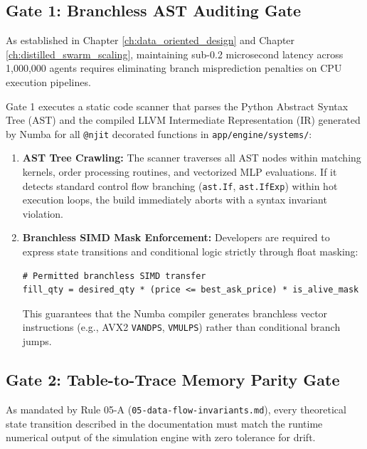 \subsection{Gate 1: Branchless AST Auditing Gate}

As established in Chapter \ref{ch:data_oriented_design} and Chapter \ref{ch:distilled_swarm_scaling}, maintaining sub-0.2 microsecond latency across 1,000,000 agents requires eliminating branch misprediction penalties on CPU execution pipelines. 

Gate 1 executes a static code scanner that parses the Python Abstract Syntax Tree (AST) and the compiled LLVM Intermediate Representation (IR) generated by Numba for all \texttt{@njit} decorated functions in \texttt{app/engine/systems/}:

\begin{enumerate}
    \item \textbf{AST Tree Crawling:} The scanner traverses all AST nodes within matching kernels, order processing routines, and vectorized MLP evaluations. If it detects standard control flow branching (\texttt{ast.If}, \texttt{ast.IfExp}) within hot execution loops, the build immediately aborts with a syntax invariant violation.
    \item \textbf{Branchless SIMD Mask Enforcement:} Developers are required to express state transitions and conditional logic strictly through float masking:
    \begin{listing}[htbp]
    \caption{Branchless Float Masking Invariant.}
    \label{listing:branchless_float_masking}
    \begin{verbatim}
# Permitted branchless SIMD transfer
fill_qty = desired_qty * (price <= best_ask_price) * is_alive_mask
    \end{verbatim}
    \end{listing}
    This guarantees that the Numba compiler generates branchless vector instructions (e.g., AVX2 \texttt{VANDPS}, \texttt{VMULPS}) rather than conditional branch jumps.
\end{enumerate}

\subsection{Gate 2: Table-to-Trace Memory Parity Gate}

As mandated by Rule 05-A (\texttt{05-data-flow-invariants.md}), every theoretical state transition described in the documentation must match the runtime numerical output of the simulation engine with zero tolerance for drift.

